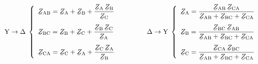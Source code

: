 \begin{equation}\label{eq:Y_D}
   \text{Y}\rightarrow\Delta\;\left\{
   \begin{array}{l}
      \cmplx{Z}\ped{AB} = \displaystyle \cmplx{Z}\ped{A} + \cmplx{Z}\ped{B} + \frac{\cmplx{Z}\ped{A}\,\cmplx{Z}\ped{B}}{\cmplx{Z}\ped{C}}  \\[3ex]
      \cmplx{Z}\ped{BC} = \displaystyle \cmplx{Z}\ped{B} + \cmplx{Z}\ped{C} + \frac{\cmplx{Z}\ped{B}\,\cmplx{Z}\ped{C}}{\cmplx{Z}\ped{A}}  \\[3ex]
      \cmplx{Z}\ped{CA} = \displaystyle \cmplx{Z}\ped{C} + \cmplx{Z}\ped{A} + \frac{\cmplx{Z}\ped{C}\, \cmplx{Z}\ped{A}}{\cmplx{Z}\ped{B}}
   \end{array}
   \right.
   \qquad\qquad
   \Delta\rightarrow\text{Y}\;\left\{
   \begin{array}{l}
      \cmplx{Z}\ped{A} = \dfrac{\cmplx{Z}\ped{AB}\, \cmplx{Z}\ped{CA}}{  \cmplx{Z}\ped{AB} + \cmplx{Z}\ped{BC}+ \cmplx{Z}\ped{CA}}  \\[3ex]
      \cmplx{Z}\ped{B} = \dfrac{\cmplx{Z}\ped{BC}\, \cmplx{Z}\ped{AB}}{  \cmplx{Z}\ped{AB} + \cmplx{Z}\ped{BC}+ \cmplx{Z}\ped{CA}}  \\[3ex]
      \cmplx{Z}\ped{C} = \dfrac{\cmplx{Z}\ped{CA}\, \cmplx{Z}\ped{BC}}{  \cmplx{Z}\ped{AB} + \cmplx{Z}\ped{BC}+ \cmplx{Z}\ped{CA}}
   \end{array}
   \right.
\end{equation}

\begin{center}
    
    \label{pic:Y_D}
\end{center}


